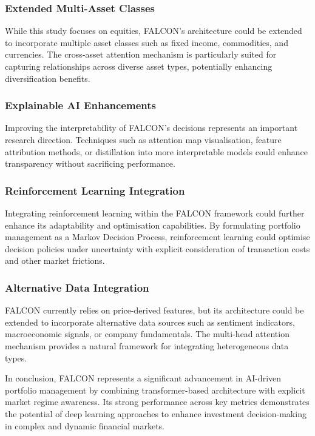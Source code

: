 \documentclass[conference]{IEEEtran}
\begin{document}
\subsubsection{Extended Multi-Asset Classes}
While this study focuses on equities, FALCON's architecture could be extended to incorporate multiple asset classes such as fixed income, commodities, and currencies. The cross-asset attention mechanism is particularly suited for capturing relationships across diverse asset types, potentially enhancing diversification benefits.

\subsubsection{Explainable AI Enhancements}
Improving the interpretability of FALCON's decisions represents an important research direction. Techniques such as attention map visualisation, feature attribution methods, or distillation into more interpretable models could enhance transparency without sacrificing performance.

\subsubsection{Reinforcement Learning Integration}
Integrating reinforcement learning within the FALCON framework could further enhance its adaptability and optimisation capabilities. By formulating portfolio management as a Markov Decision Process, reinforcement learning could optimise decision policies under uncertainty with explicit consideration of transaction costs and other market frictions.

\subsubsection{Alternative Data Integration}
FALCON currently relies on price-derived features, but its architecture could be extended to incorporate alternative data sources such as sentiment indicators, macroeconomic signals, or company fundamentals. The multi-head attention mechanism provides a natural framework for integrating heterogeneous data types.

In conclusion, FALCON represents a significant advancement in AI-driven portfolio management by combining transformer-based architecture with explicit market regime awareness. Its strong performance across key metrics demonstrates the potential of deep learning approaches to enhance investment decision-making in complex and dynamic financial markets.
\end{document}
